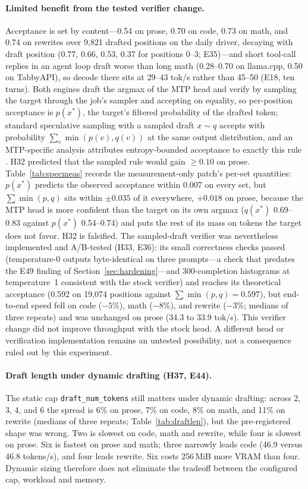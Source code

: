 \documentclass[11pt]{article}
\newcommand{\q}[1]{\texttt{#1}}
\begin{document}
\paragraph{Limited benefit from the tested verifier change.}
Acceptance is set by content---0.54 on prose, 0.70 on code, 0.73 on math,
and 0.74 on rewrites over 9,821 drafted positions on the daily driver,
decaying with draft position (0.77, 0.66, 0.53, 0.37 for positions 0--3;
E35)---and short tool-call replies in an agent loop draft worse than long
math (0.28--0.70 on llama.cpp, 0.50 on TabbyAPI), so decode there sits at
29--43 tok/s rather than 45--50 (E18, ten turns). Both engines draft the
argmax of the MTP head and verify by sampling the target through the job's
sampler and accepting on equality, so per-position acceptance is $p(x^*)$,
the target's filtered probability of the drafted token; standard speculative
sampling with a sampled draft $x\sim q$
\citep{leviathan2023fast,chen2023accelerating} accepts with probability
$\sum_v \min(p(v),q(v))$ at the same output distribution, and an MTP-specific
analysis attributes entropy-bounded acceptance to exactly this rule
\citep{li2026bebop}. H32 predicted that the sampled rule would gain
$\ge0.10$ on prose. Table~\ref{tab:specmeas} records the measurement-only
patch's per-set quantities: $p(x^*)$ predicts the observed acceptance within 0.007 on
every set, but $\sum\min(p,q)$ sits within $\pm0.035$ of it everywhere,
$+0.018$ on prose, because the MTP head is more confident than the target on
its own argmax ($q(x^*)$ 0.69--0.83 against $p(x^*)$ 0.54--0.74) and puts the
rest of its mass on tokens the target does not favor. H32 is falsified. The
sampled-draft verifier was nevertheless implemented and A/B-tested (H33,
E36): its small correctness checks passed (temperature-0 outputs byte-identical on three
prompts---a check that predates the E49 finding of
Section~\ref{sec:hardening}---and 300-completion histograms at temperature~1
consistent with the stock verifier) and reaches its
theoretical acceptance (0.592 on 19,074 positions against
$\sum\min(p,q)=0.597$), but end-to-end speed fell on code ($-5\%$), math
($-8\%$), and rewrite ($-3\%$; medians of three repeats) and was unchanged on
prose (34.3 to 33.9 tok/s). This verifier change did not improve throughput
with the stock head. A different head or verification implementation remains
an untested possibility, not a consequence ruled out by this experiment.

\paragraph{Draft length under dynamic drafting (H37, E44).}
The static cap \q{draft\_num\_tokens} still matters under dynamic drafting:
across 2, 3, 4, and 6 the spread is 6\% on prose, 7\% on code, 8\% on math,
and 11\% on rewrite (medians of three repeats; Table~\ref{tab:draftlen}),
but the pre-registered shape was wrong. Two is slowest on code, math and rewrite, while four is slowest on prose.
Six is fastest on prose and math; three narrowly leads code (46.9 versus
46.8 tokens/s), and four leads rewrite. Six costs 256\,MiB more VRAM than
four. Dynamic sizing therefore does not eliminate the tradeoff between the
configured cap, workload and memory.
\end{document}

